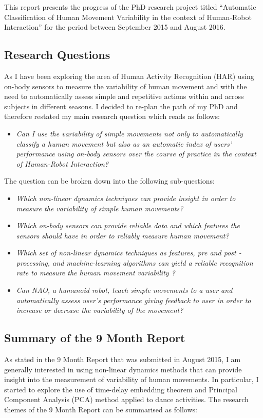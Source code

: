 \documentclass[9pt,journal,onecolumn,compsoc]{IEEEtran}
\begin{document}
This report presents the progress of the PhD research project titled
``Automatic Classification of Human Movement Variability in the context of Human-Robot Interaction''
for the period between September 2015 and August 2016.


\subsection{Research Questions}
As
I have been exploring the area of Human Activity Recognition (HAR)
using on-body sensors to measure the variability of human movement
and
with the need to automatically assess simple and repetitive actions
within and across subjects in different seasons.
I decided to re-plan the path of my PhD and therefore restated my main research question which reads as follows:
\begin{itemize}
 \item \textit{Can I use the variability of simple movements not only to automatically classify
 a human movement but also as an automatic index of users' performance using on-body sensors
over the course of practice in the context
of Human-Robot Interaction?}
\end{itemize}
The question can be broken down into the following sub-questions:
\begin{itemize}
 \item \textit{Which non-linear dynamics  techniques can provide insight in order to measure
 the variability of simple human movements?}

 \item \textit{Which on-body sensors can provide reliable data
 and which features the sensors should have in order to reliably measure human movement?}

 \item \textit{Which set of
 non-linear dynamics techniques as features,
 pre and post -processing, and machine-learning algorithms
  can yield a reliable recognition rate to measure the human movement variability
  ?}

 \item \textit{Can NAO, a humanoid robot,
 teach simple movements to a user and automatically assess user's performance
 giving feedback to user in order to increase or decrease the variability of the movement?}

\end{itemize}

\subsection{Summary of the 9 Month Report}
As stated in the 9 Month Report that was submitted in August 2015,
I am generally interested in using non-linear dynamics methods
that can provide insight into the measurement of variability of human movements.
In particular, I started to explore the use of time-delay embedding theorem and
Principal Component Analysis (PCA) method applied to dance activities.
The research themes of the 9 Month Report can be summarised as follows:
\end{document}

